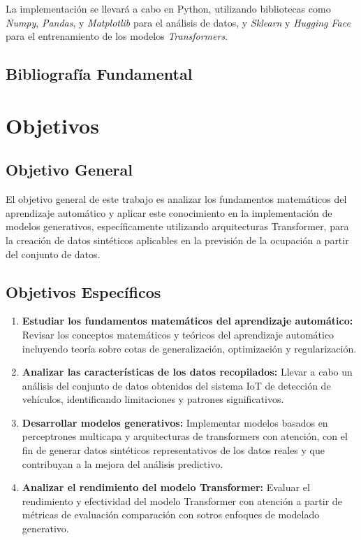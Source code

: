 La implementación se llevará a cabo en Python, utilizando bibliotecas como
\textit{Numpy}, \textit{Pandas}, y \textit{Matplotlib} para el análisis de
datos, y \textit{Sklearn} y \textit{Hugging Face} para el entrenamiento de los
modelos \textit{Transformers}.

\subsection{Bibliografía Fundamental}

\section{Objetivos}

\subsection{Objetivo General}

El objetivo general de este trabajo es analizar los fundamentos matemáticos del
aprendizaje automático y aplicar este conocimiento en la implementación de
modelos generativos, específicamente utilizando arquitecturas Transformer, para
la creación de datos sintéticos aplicables en la previsión de la ocupación a
partir del conjunto de datos.

\subsection{Objetivos Específicos}

\begin{enumerate}
    \item \textbf{Estudiar los fundamentos matemáticos del aprendizaje automático:}
    Revisar los conceptos matemáticos y teóricos del aprendizaje automático incluyendo
    teoría sobre cotas de generalización, optimización y regularización.   

    \item \textbf{Analizar las características de los datos recopilados:} Llevar
    a cabo un análisis del conjunto de datos obtenidos del sistema IoT de
    detección de vehículos, identificando limitaciones y patrones
    significativos.
    
    \item \textbf{Desarrollar modelos generativos:} Implementar modelos basados
    en perceptrones multicapa y arquitecturas de transformers con atención, con
    el fin de generar datos sintéticos representativos de los datos reales y que
    contribuyan a la mejora del análisis predictivo.
    
    \item \textbf{Analizar el rendimiento del modelo Transformer:} Evaluar el
    rendimiento y efectividad del modelo Transformer con atención a partir de
    métricas de evaluación comparación con sotros enfoques de modelado
    generativo. 

\end{enumerate}